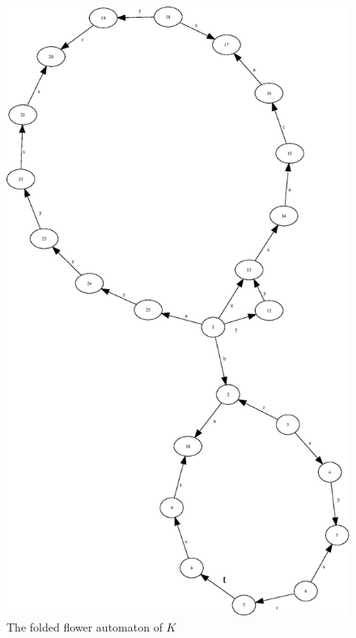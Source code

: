 \documentclass[a4paper,12pt]{article}
\numberwithin{equation}{section}
\numberwithin{figure}{section}
\begin{document}
\begin{figure}
\begin{center}
\includegraphics[scale=0.5,bb=0 0 820 720]{ex_K_folded.eps}
\caption{The folded flower automaton of $K$}
\label{fig:Kflower}
\end{center}
\end{figure}
\end{document}
